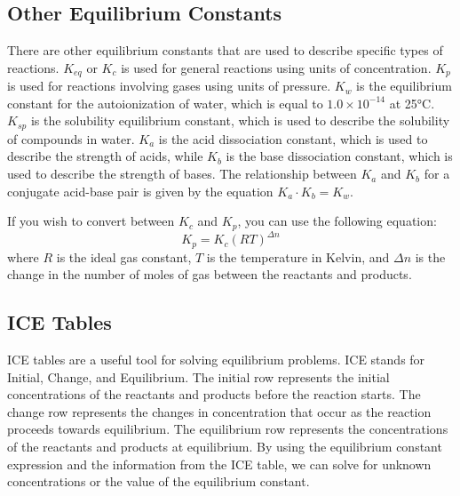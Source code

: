 \subsection{Other Equilibrium Constants}\label{sec:other_equilibrium_constants}
There are other equilibrium constants that are used to describe specific types of reactions. $K_{eq}$ or $K_c$ is used for general reactions using units of concentration. $K_p$ is used for reactions involving gases using units of pressure. $K_w$ is the equilibrium constant for the autoionization of water, which is equal to $1.0 \times 10^{-14}$ at 25°C. $K_{sp}$ is the solubility equilibrium constant, which is used to describe the solubility of compounds in water. $K_a$ is the acid dissociation constant, which is used to describe the strength of acids, while $K_b$ is the base dissociation constant, which is used to describe the strength of bases. The relationship between $K_a$ and $K_b$ for a conjugate acid-base pair is given by the equation $K_a \cdot K_b = K_w$.

If you wish to convert between $K_c$ and $K_p$, you can use the following equation:
\begin{equation}\label{eq:KcKp}
    K_p = K_c(RT)^{\Delta n}
\end{equation}
where $R$ is the ideal gas constant, $T$ is the temperature in Kelvin, and $\Delta n$ is the change in the number of moles of gas between the reactants and products.

\subsection{ICE Tables}
ICE tables are a useful tool for solving equilibrium problems. ICE stands for Initial, Change, and Equilibrium. The initial row represents the initial concentrations of the reactants and products before the reaction starts. The change row represents the changes in concentration that occur as the reaction proceeds towards equilibrium. The equilibrium row represents the concentrations of the reactants and products at equilibrium. By using the equilibrium constant expression and the information from the ICE table, we can solve for unknown concentrations or the value of the equilibrium constant.

